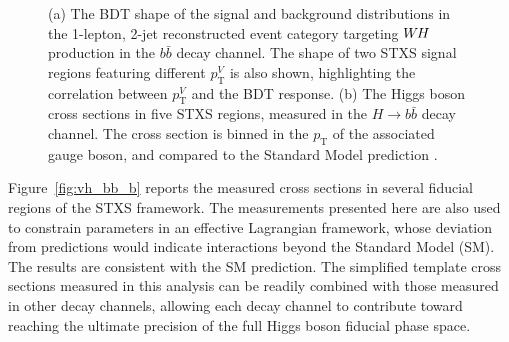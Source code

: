 \documentclass{moriond}
\def\wh{\texorpdfstring{\ensuremath{W\kern -0.1em H}\xspace}{WH\xspace}}
\begin{document}
\begin{figure}[!htbp]
  \centering
  \caption{
    (a) The BDT shape of the signal and background distributions in the 1-lepton, 2-jet
    reconstructed event category targeting \wh production in the $b\bar b$ decay channel. The shape of two STXS signal regions
    featuring different $p^{V}_\mathrm{T}$ is also shown, highlighting the correlation between
    $p^{V}_\mathrm{T}$ and the BDT response.
    (b) The Higgs boson cross sections in five STXS regions, measured in the $H{\rightarrow}b\bar b$ decay channel.
    The cross section is binned in the $p_\mathrm{T}$ of
    the associated gauge boson, and compared to the Standard Model prediction \cite{Aaboud:2019nan}.
  }
  \label{fig:vh_bb}
\end{figure}

Figure~\ref{fig:vh_bb_b} reports the measured cross sections in several fiducial regions
of the STXS framework. The measurements presented here are also used
to constrain parameters in an effective Lagrangian framework, whose
deviation from predictions would indicate interactions beyond the Standard Model (SM).
The results are consistent with the SM prediction.
The
simplified template cross sections measured in this analysis can be readily combined with those measured in other
decay channels, allowing each decay channel to contribute toward reaching the ultimate precision of
the full Higgs boson fiducial phase space.
\end{document}
